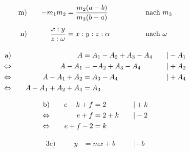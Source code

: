 \begin{exercise}
\begin{alignat*}{4}
      \exnum{m)}&\quad &          -m_{1}m_{2}&=\frac{m_{2}(a-b)}{m_{3}(b-a)}             & \quad&\quad & \quad&\text{nach $m_{3}$}           \\
      \exnum{n)}&\quad & \frac{x:y}{z:\omega}&=x:y:z:\alpha                              & \quad&\quad & \quad&\text{nach $\omega$}
    \end{alignat*}
  \fi
  \ifoutcome\outcome\par
    \begin{minipage}[t]{0.59\linewidth}
      \makeatletter\@fleqntrue\makeatother
      \begin{alignat*}{3}
        \text{a)}&\quad
        &
        A&=A_{1}-A_{2}+A_{3}-A_{4}
        &
        \quad&|-A_{1}
        \\
        \Leftrightarrow&\quad
        &
        A-A_{1}&=-A_{2}+A_{3}-A_{4}
        &
        \quad&|+A_{2}
        \\
        \Leftrightarrow&\quad
        &
        A-A_{1}+A_{2}&=A_{3}-A_{4}
        &
        \quad&|+A_{4}
        \\
        \Leftrightarrow&\quad
        &
        A-A_{1}+A_{2}+A_{4}&=A_{3}
        &
        \quad&\relax
      \end{alignat*}
    \end{minipage}\hfill
    \begin{minipage}[t]{0.34\linewidth}
      \makeatletter\@fleqntrue\makeatother
      \begin{alignat*}{3}
        \text{b)}&\quad
        &
        e-k+f&=2
        &
        \quad&|+k
        \\
        \Leftrightarrow&\quad
        &
        e+f&=2+k
        &
        \quad&|-2
        \\
        \Leftrightarrow&\quad
        &
        e+f-2&=k
        &
        \quad&\relax
      \end{alignat*}
    \end{minipage}
    \begin{minipage}[t]{0.47\linewidth}
      \makeatletter\@fleqntrue\makeatother
      \begin{alignat*}{3}
        \text{c)}&\quad
        &
        y&=mx+b
        &
        \quad&|-b
        \\

\end{alignat*}
\end{minipage}
\end{exercise}
